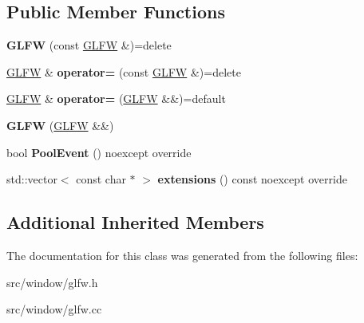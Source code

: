 \subsection*{Public Member Functions}
\begin{DoxyCompactItemize}
\item 
\hypertarget{classae_1_1_g_l_f_w_a3f91f115acec8b4abc62d5f3f51c8674}{}\label{classae_1_1_g_l_f_w_a3f91f115acec8b4abc62d5f3f51c8674} 
{\bfseries G\+L\+FW} (const \hyperlink{classae_1_1_g_l_f_w}{G\+L\+FW} \&)=delete
\item 
\hypertarget{classae_1_1_g_l_f_w_afaa7b320295e3437529407c51d279e31}{}\label{classae_1_1_g_l_f_w_afaa7b320295e3437529407c51d279e31} 
\hyperlink{classae_1_1_g_l_f_w}{G\+L\+FW} \& {\bfseries operator=} (const \hyperlink{classae_1_1_g_l_f_w}{G\+L\+FW} \&)=delete
\item 
\hypertarget{classae_1_1_g_l_f_w_af3d2c2732b89aefc5596c0ec44d39b9e}{}\label{classae_1_1_g_l_f_w_af3d2c2732b89aefc5596c0ec44d39b9e} 
\hyperlink{classae_1_1_g_l_f_w}{G\+L\+FW} \& {\bfseries operator=} (\hyperlink{classae_1_1_g_l_f_w}{G\+L\+FW} \&\&)=default
\item 
\hypertarget{classae_1_1_g_l_f_w_a968689c66e954617a81704025c73f016}{}\label{classae_1_1_g_l_f_w_a968689c66e954617a81704025c73f016} 
{\bfseries G\+L\+FW} (\hyperlink{classae_1_1_g_l_f_w}{G\+L\+FW} \&\&)
\item 
\hypertarget{classae_1_1_g_l_f_w_a3df047bd36e3e64d79e99038762b5ce2}{}\label{classae_1_1_g_l_f_w_a3df047bd36e3e64d79e99038762b5ce2} 
bool {\bfseries Pool\+Event} () noexcept override
\item 
\hypertarget{classae_1_1_g_l_f_w_a5ec4f5b56e7f9a2011aaa4716503c563}{}\label{classae_1_1_g_l_f_w_a5ec4f5b56e7f9a2011aaa4716503c563} 
std\+::vector$<$ const char $\ast$ $>$ {\bfseries extensions} () const noexcept override
\end{DoxyCompactItemize}
\subsection*{Additional Inherited Members}


The documentation for this class was generated from the following files\+:\begin{DoxyCompactItemize}
\item 
src/window/glfw.\+h\item 
src/window/glfw.\+cc\end{DoxyCompactItemize}
